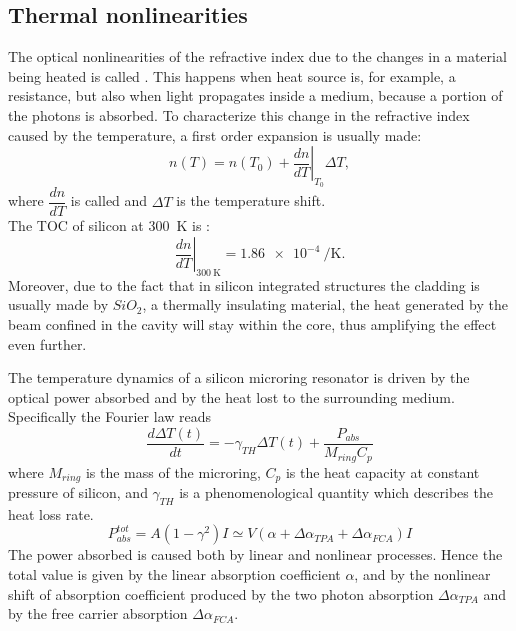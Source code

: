 \subsection{Thermal nonlinearities}
\label{ssec:Thermal_nonlinearities}
The optical nonlinearities of the refractive index due to the changes in a material being heated is called .
This happens when heat source is, for example, a resistance, but also when light propagates inside a medium, because a portion of the photons is absorbed.
To characterize this change in the refractive index caused by the temperature, a first order expansion is usually made:
\begin{equation}
	n\left(T\right) = n\left(T_0\right) + \left.\dfrac{dn}{dT}\right|_{T_0} \Delta T,
	\label{eq:TOC}
\end{equation}
where $\dfrac{dn}{dT}$ is called  and $\Delta T$ is the temperature shift.\\
The \ac{TOC} of silicon at \SI{300}{\K} is \cite{johnson2006self} :
\begin{equation}
	\left.\dfrac{dn}{dT}\right|_{\SI{300}{\K}} = \SI{1.86e-4}{\per\K}.
	\label{eq:Si_TOC}
\end{equation}
Moreover, due to the fact that in silicon integrated structures the cladding is usually made by $SiO_2$, a thermally insulating material, the heat generated by the beam confined in the cavity will stay within the core, thus amplifying the effect even further.

The temperature dynamics of a silicon microring resonator is driven by the optical power absorbed and by the heat lost to the surrounding medium.
Specifically the Fourier law reads
\begin{equation}
	\dfrac{d\Delta T(t)}{dt} = -\gamma_{TH} \Delta T(t) + \dfrac{P_{abs}}{M_{ring}C_p}
\end{equation}
where $M_{ring}$ is the mass of the microring, $C_p$ is the heat capacity at constant pressure of silicon, and $\gamma_{TH}$ is a phenomenological quantity which describes the heat loss rate.
\begin{equation}
P_{abs}^{tot} = A \left(1-\gamma^2\right) I
	\simeq V\left(\alpha + \Delta\alpha_{TPA} + \Delta\alpha_{FCA} \right) I
\end{equation}
The power absorbed is caused both by linear and nonlinear processes.
Hence the total value is given by the linear absorption coefficient $\alpha$, and by the nonlinear shift of absorption coefficient produced by the two photon absorption $\Delta\alpha_{TPA}$ and by the free carrier absorption $\Delta\alpha_{FCA}$.

